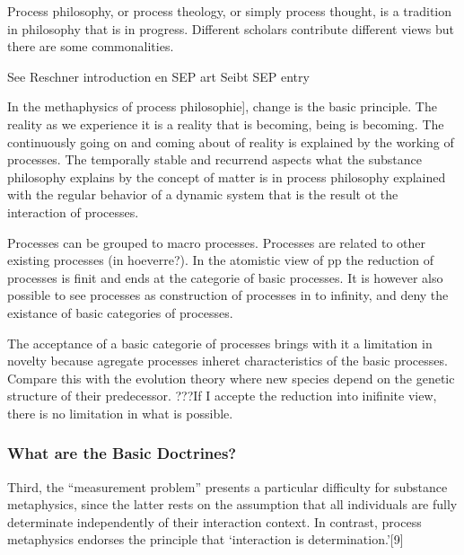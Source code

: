 Process philosophy, or process theology, or simply process thought, is a tradition in philosophy that is in progress. Different scholars contribute different views but there are some commonalities.

See Reschner introduction en SEP art \cite{Rescher-2012-sep}
Seibt SEP entry \cite{Seibt-2013-sep}

In the methaphysics of process philosophie], change is the basic principle. The reality as we experience it is a reality that is becoming, being is becoming.
The continuously going on and coming about of reality is explained by the working of processes. The temporally stable and recurrend aspects what the substance philosophy explains by the concept of matter is in process philosophy explained with the regular behavior of a dynamic system that is the result ot the interaction of processes.

Processes can be grouped to macro processes. Processes are related to other existing processes (in hoeverre?).
In the atomistic view of pp the reduction of processes is finit and ends at the categorie of basic processes. It is however also possible to see processes as construction of processes in to infinity, and deny the existance of basic categories of processes.

The acceptance of a basic categorie of processes brings with it a limitation in novelty because agregate processes inheret characteristics of the basic processes. Compare this with the evolution theory where new species depend on the genetic structure of their predecessor.
???If I accepte the reduction into inifinite view, there is no limitation in what is possible.



\subsubsection{What are the Basic Doctrines?}
Third, the “measurement problem” presents a particular difficulty for substance metaphysics, since the latter rests on the assumption that all individuals are fully determinate independently of their interaction context. In contrast, process metaphysics endorses the principle that ‘interaction is determination.’[9]

